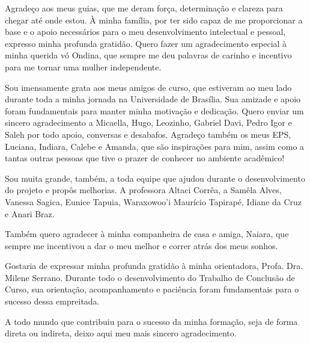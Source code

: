\begin{agradecimentos}
    Agradeço aos meus guias, que me deram força, determinação e clareza para chegar até onde estou. À minha família, por ter sido capaz de me proporcionar a base e o apoio necessários para o meu desenvolvimento intelectual e pessoal, expresso minha profunda gratidão. Quero fazer um agradecimento especial à minha querida vó Ondina, que sempre me deu palavras de carinho e incentivo para me tornar uma mulher independente.

    Sou imensamente grata aos meus amigos de curso, que estiveram ao meu lado durante toda a minha jornada na Universidade de Brasília. Sua amizade e apoio foram fundamentais para manter minha motivação e dedicação. Quero enviar um sincero agradecimento a Micaella, Hugo, Leozinho, Gabriel Davi, Pedro Igor e Saleh por todo apoio, conversas e desabafos. Agradeço também os meus EPS, Luciana, Indiara, Calebe e Amanda, que são inspirações para mim, assim como a tantas outras pessoas que tive o prazer de conhecer no ambiente acadêmico!
    
    Sou muita grande, também, a toda equipe que ajudou durante o desenvolvimento do projeto e propôs melhorias. A professora Altaci Corrêa, a Samêla Alves, Vanessa Sagica, Eunice Tapuia, Waraxowoo'i Maurício Tapirapé, Idiane da Cruz e Anari Braz.

    Também quero agradecer à minha companheira de casa e amiga, Naiara, que sempre me incentivou a dar o meu melhor e correr atrás dos meus sonhos.
    
    Gostaria de expressar minha profunda gratidão à minha orientadora, Profa. Dra. Milene Serrano. Durante todo o desenvolvimento do Trabalho de Conclusão de Curso, sua orientação, acompanhamento e paciência foram fundamentais para o sucesso dessa empreitada.
    
    A todo mundo que contribuiu para o sucesso da minha formação, seja de forma direta ou indireta, deixo aqui meu mais sincero agradecimento.
\end{agradecimentos}
